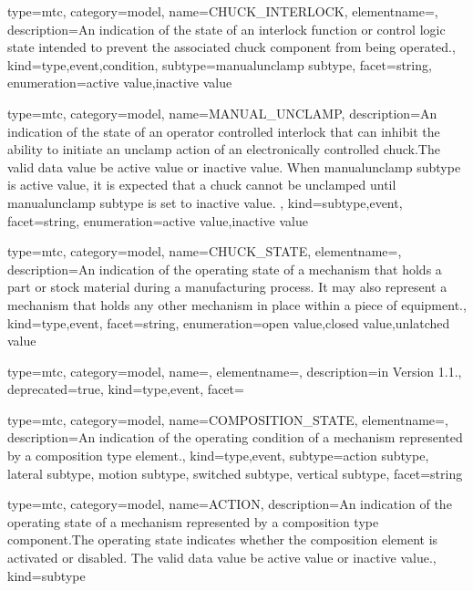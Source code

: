 {
  type=mtc,
  category=model,
  name={CHUCK\_INTERLOCK},
  elementname=,
  description={An indication of the state of an interlock function or control logic state intended to prevent the associated \gls{chuck} component from being operated.},
  kind={type,event,condition},
  subtype={\gls{manualunclamp subtype}},
  facet={\gls{string}},
  enumeration={\gls{active value},\gls{inactive value}}
}


{
  type=mtc,
  category=model,
  name={MANUAL\_UNCLAMP},
  description={An indication of the state of an operator controlled interlock that can inhibit the ability to initiate an unclamp action of an electronically controlled chuck.\newline The \gls{valid data value} \must be \gls{active value} or \gls{inactive value}. \newline When \gls{manualunclamp subtype} is \gls{active value}, it is expected that a chuck cannot be unclamped until \gls{manualunclamp subtype} is set to \gls{inactive value}. },
  kind={subtype,event},
  facet={\gls{string}},
  enumeration={\gls{active value},\gls{inactive value}}
}


{
  type=mtc,
  category=model,
  name={CHUCK\_STATE},
  elementname=,
  description={An indication of the operating state of a mechanism that holds a part or stock material during a manufacturing process. It may also represent a mechanism that holds any other mechanism in place within a piece of equipment.},
  kind={type,event},
  facet={\gls{string}},
  enumeration={\gls{open value},\gls{closed value},\gls{unlatched value}}
}


{
  type=mtc,
  category=model,
  name=,
  elementname=,
  description={\DEPRECATED in Version 1.1.},
  deprecated={true},
  kind={type,event},
  facet={}
}


{
  type=mtc,
  category=model,
  name={COMPOSITION\_STATE},
  elementname=,
  description={An indication of the operating condition of a mechanism represented by a \gls{composition} type element.},
  kind={type,event},
  subtype={\gls{action subtype}, \gls{lateral subtype}, \gls{motion subtype}, \gls{switched subtype}, \gls{vertical subtype}},
  facet={\gls{string}}
}


{
  type=mtc,
  category=model,
  name={ACTION},
  description={An indication of the operating state of a mechanism represented by a \gls{composition} type component.\newline The operating state indicates whether the \gls{composition} element is activated or disabled. \newline The \gls{valid data value} \must be \gls{active value} or \gls{inactive value}.},
  kind={subtype}
}


